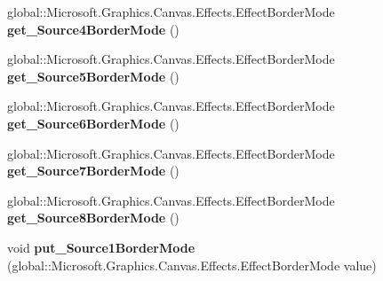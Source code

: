 \begin{DoxyCompactItemize}
\mbox{\label{class_microsoft_1_1_graphics_1_1_canvas_1_1_effects_1_1_pixel_shader_effect_a2f4fc064c8cd8796dcb06f70a1775224}} 
global\+::\+Microsoft.\+Graphics.\+Canvas.\+Effects.\+Effect\+Border\+Mode {\bfseries get\+\_\+\+Source4\+Border\+Mode} ()
\item 
\mbox{\label{class_microsoft_1_1_graphics_1_1_canvas_1_1_effects_1_1_pixel_shader_effect_a8404477197934d58fbad5e80c866b5aa}} 
global\+::\+Microsoft.\+Graphics.\+Canvas.\+Effects.\+Effect\+Border\+Mode {\bfseries get\+\_\+\+Source5\+Border\+Mode} ()
\item 
\mbox{\label{class_microsoft_1_1_graphics_1_1_canvas_1_1_effects_1_1_pixel_shader_effect_a369f8418143f8fc573c4abcd88f3c85b}} 
global\+::\+Microsoft.\+Graphics.\+Canvas.\+Effects.\+Effect\+Border\+Mode {\bfseries get\+\_\+\+Source6\+Border\+Mode} ()
\item 
\mbox{\label{class_microsoft_1_1_graphics_1_1_canvas_1_1_effects_1_1_pixel_shader_effect_a5101ee583e41a86de2976fc3af6c15f3}} 
global\+::\+Microsoft.\+Graphics.\+Canvas.\+Effects.\+Effect\+Border\+Mode {\bfseries get\+\_\+\+Source7\+Border\+Mode} ()
\item 
\mbox{\label{class_microsoft_1_1_graphics_1_1_canvas_1_1_effects_1_1_pixel_shader_effect_a6db2749a8d5bcfaa6f649707d031982b}} 
global\+::\+Microsoft.\+Graphics.\+Canvas.\+Effects.\+Effect\+Border\+Mode {\bfseries get\+\_\+\+Source8\+Border\+Mode} ()
\item 
\mbox{\label{class_microsoft_1_1_graphics_1_1_canvas_1_1_effects_1_1_pixel_shader_effect_a3216042cd0ad5c5a2487a9a6ac3bda50}} 
void {\bfseries put\+\_\+\+Source1\+Border\+Mode} (global\+::\+Microsoft.\+Graphics.\+Canvas.\+Effects.\+Effect\+Border\+Mode value)
\item 
\mbox{\label{class_microsoft_1_1_graphics_1_1_canvas_1_1_effects_1_1_pixel_shader_effect_ad3598fd026e4461ecfa8c884d0b0a4a3}} 

\end{DoxyCompactItemize}
